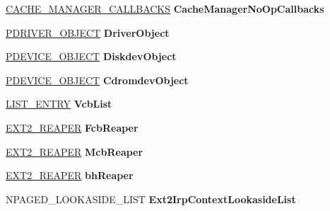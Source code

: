 \begin{DoxyCompactItemize}
\hyperlink{struct___c_a_c_h_e___m_a_n_a_g_e_r___c_a_l_l_b_a_c_k_s}{C\+A\+C\+H\+E\+\_\+\+M\+A\+N\+A\+G\+E\+R\+\_\+\+C\+A\+L\+L\+B\+A\+C\+KS} {\bfseries Cache\+Manager\+No\+Op\+Callbacks}
\item 
\mbox{\label{struct___e_x_t2___g_l_o_b_a_l_a8275bcb061b47f715a99f936c280e8f0}} 
\hyperlink{struct___d_r_i_v_e_r___o_b_j_e_c_t}{P\+D\+R\+I\+V\+E\+R\+\_\+\+O\+B\+J\+E\+CT} {\bfseries Driver\+Object}
\item 
\mbox{\label{struct___e_x_t2___g_l_o_b_a_l_a7cdbb9e80b3d1ab5d9ce3b70fb8fd68c}} 
\hyperlink{struct___d_e_v_i_c_e___o_b_j_e_c_t}{P\+D\+E\+V\+I\+C\+E\+\_\+\+O\+B\+J\+E\+CT} {\bfseries Diskdev\+Object}
\item 
\mbox{\label{struct___e_x_t2___g_l_o_b_a_l_aff45af893cda5f4ca35d00c5e4c26293}} 
\hyperlink{struct___d_e_v_i_c_e___o_b_j_e_c_t}{P\+D\+E\+V\+I\+C\+E\+\_\+\+O\+B\+J\+E\+CT} {\bfseries Cdromdev\+Object}
\item 
\mbox{\label{struct___e_x_t2___g_l_o_b_a_l_afb6e48aaee1e1027bf989c5638ed405e}} 
\hyperlink{struct___l_i_s_t___e_n_t_r_y}{L\+I\+S\+T\+\_\+\+E\+N\+T\+RY} {\bfseries Vcb\+List}
\item 
\mbox{\label{struct___e_x_t2___g_l_o_b_a_l_afd086ff50e7e3eb454277964bd38f702}} 
\hyperlink{struct___e_x_t2___r_e_a_p_e_r}{E\+X\+T2\+\_\+\+R\+E\+A\+P\+ER} {\bfseries Fcb\+Reaper}
\item 
\mbox{\label{struct___e_x_t2___g_l_o_b_a_l_ae8a48f689bccd183a3a17def5c3e3da2}} 
\hyperlink{struct___e_x_t2___r_e_a_p_e_r}{E\+X\+T2\+\_\+\+R\+E\+A\+P\+ER} {\bfseries Mcb\+Reaper}
\item 
\mbox{\label{struct___e_x_t2___g_l_o_b_a_l_a9767ac06712449f9165ba753ca299a0b}} 
\hyperlink{struct___e_x_t2___r_e_a_p_e_r}{E\+X\+T2\+\_\+\+R\+E\+A\+P\+ER} {\bfseries bh\+Reaper}
\item 
\mbox{\label{struct___e_x_t2___g_l_o_b_a_l_a5e6e498c2c85ae2a8fbc4f5cf664117a}} 
N\+P\+A\+G\+E\+D\+\_\+\+L\+O\+O\+K\+A\+S\+I\+D\+E\+\_\+\+L\+I\+ST {\bfseries Ext2\+Irp\+Context\+Lookaside\+List}

\end{DoxyCompactItemize}
